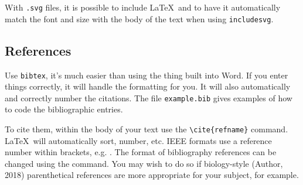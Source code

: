 \documentclass{wrcecapstone}
\begin{document}
With \lstinline{.svg} files, it is possible to include \LaTeX\ and to have it automatically match the font and size with the body of the text when using \lstinline{includesvg}. 

\subsection{References}
Use \lstinline{bibtex}, it's much easier than using the thing built into Word. If you enter things correctly, it will handle the formatting for you. It will also automatically and correctly number the citations. The file \lstinline{example.bib} gives examples of how to code the bibliographic entries. 

To cite them, within the body of your text use the \lstinline|\cite{refname}| command. \LaTeX\ will automatically sort, number, etc. IEEE formats use a reference number within brackets, e.g. \cite{young1964synthetic}. The format of bibliography references can be changed using the \lstinline|| command. You may wish to do so if biology-style (Author, 2018) parenthetical references are more appropriate for your subject, for example. 
\end{document}
